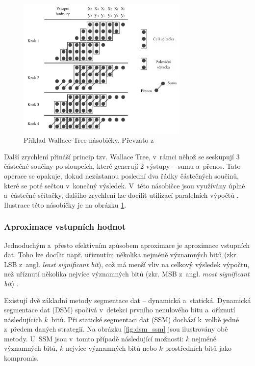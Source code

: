 \begin{figure}[H]
    \centering
    \includegraphics[width=0.75\textwidth]{obrazky-figures/wallacetree.png}
    \caption{Příklad Wallace-Tree násobičky. Převzato z~\cite{approx_mult_survey}}
    \label{fig:wallacetree}
\end{figure}

Další zrychlení přináší princip tzv. Wallace Tree, v~rámci něhož se seskupují 3 částečné součiny po sloupcích, které generují 2 výstupy -- sumu a~přenos. Tato operace se opakuje, dokud nezůstanou poslední dva řádky částečných součinů, které se poté sečtou v~konečný výsledek. V~této násobičce jsou využívány úplné a~částečné sčítačky, dalšího zrychlení lze docílit utilizací paralelních výpočtů \cite{wallace_tree}. Ilustrace této násobičky je na obrázku \ref{fig:wallacetree}.

\subsubsection{Aproximace vstupních hodnot}
Jednoduchým a~přesto efektivním způsobem aproximace je aproximace vstupních dat. Toho lze docílit např. uříznutím několika nejméně významných bitů (zkr. LSB z~angl. \textit{least significant bit}), což má menší vliv na celkový výsledek výpočtu, než uříznutí několika nejvíce významných bitů (zkr. MSB z~angl. \textit{most significant bit}) \cite{approx_mult_survey}. 

Existují dvě základní metody segmentace dat -- dynamická a~statická. Dynamická segmentace dat (DSM) spočívá v~detekci prvního nenulového bitu a~oříznutí následujících $k$~bitů. Při statické segmentaci dat (SSM) dochází k~volbě jedné z~předem daných strategií. Na obrázku \ref{fig:dsm_ssm} jsou ilustrovány obě metody. U~SSM jsou v~tomto případě následující možnosti: $k$ nejméně významných bitů, $k$ nejvíce významných bitů nebo $k$ prostředních bitů jako kompromis.

